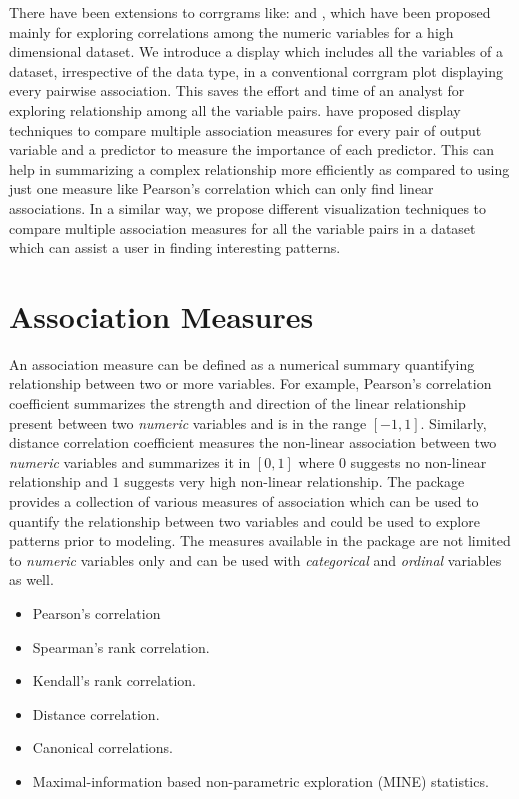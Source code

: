 There have been extensions to corrgrams like:
\citep{buja2016visualization} and \citep{sCorrPlot}, which have been
proposed mainly for exploring correlations among the numeric variables
for a high dimensional dataset. We introduce a display which includes
all the variables of a dataset, irrespective of the data type, in a
conventional corrgram plot displaying every pairwise association. This
saves the effort and time of an analyst for exploring relationship among
all the variable pairs. \citep{kuhn2013applied} have proposed display
techniques to compare multiple association measures for every pair of
output variable and a predictor to measure the importance of each
predictor. This can help in summarizing a complex relationship more
efficiently as compared to using just one measure like Pearson's
correlation which can only find linear associations. In a similar way,
we propose different visualization techniques to compare multiple
association measures for all the variable pairs in a dataset which can
assist a user in finding interesting patterns.

\hypertarget{association-measures}{%
\section{Association Measures}\label{association-measures}}

An association measure can be defined as a numerical summary quantifying
relationship between two or more variables. For example, Pearson's
correlation coefficient summarizes the strength and direction of the
linear relationship present between two \emph{numeric} variables and is
in the range \([-1,1]\). Similarly, distance correlation coefficient
measures the non-linear association between two \emph{numeric} variables
and summarizes it in \([0,1]\) where \(0\) suggests no non-linear
relationship and \(1\) suggests very high non-linear relationship. The
package provides a collection of various measures of association which
can be used to quantify the relationship between two variables and could
be used to explore patterns prior to modeling. The measures available in
the package are not limited to \emph{numeric} variables only and can be
used with \emph{categorical} and \emph{ordinal} variables as well.

\begin{itemize}
\item Pearson's correlation
\item Spearman's rank correlation.
\item Kendall's rank correlation.
\item Distance correlation.
\item Canonical correlations.
\item Maximal-information based non-parametric exploration (MINE) statistics.
\end{itemize}


